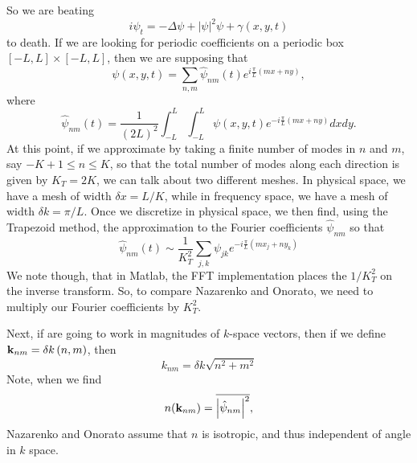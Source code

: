 \documentclass[a4paper,11pt]{article}
\begin{document}
So we are beating
\[
i\psi_{t} = -\Delta \psi + \left| \psi\right|^{2}\psi + \gamma(x,y,t)
\]
to death.  If we are looking for periodic coefficients on a periodic box $[-L,L]\times[-L,L]$, then we are supposing that
\[
\psi(x,y,t) = \sum_{n,m}\hat{\psi}_{nm}(t) e^{i\frac{\pi}{L}(mx + ny)}, 
\]
where
\[
 \hat{\psi}_{nm}(t) = \frac{1}{(2L)^{2}}\int_{-L}^{L}\int_{-L}^{L} \psi(x,y,t) e^{-i\frac{\pi}{L}(mx + ny)} dxdy.
\]
At this point, if we approximate by taking a finite number of modes in $n$ and $m$, say $-K+1\leq n \leq K$, so that the total number of modes along each direction is given by $K_{T}=2K$, we can talk about two different meshes.  In physical space, we have a mesh of width $\delta x = L/K$, while in frequency space, we have a mesh of width $\delta k = \pi/L$.  Once we discretize in physical space, we then find, using the Trapezoid method, the approximation to the Fourier coefficients $\hat{\psi}_{nm}$ so that 
\[
\hat{\psi}_{nm}(t) \sim \frac{1}{K_{T}^{2}}\sum_{j,k}\psi_{jk}e^{-i\frac{\pi}{L}(mx_{j} + ny_{k})}
\]
We note though, that in Matlab, the FFT implementation places the $1/K_{T}^{2}$ on the inverse transform.  So, to compare Nazarenko and Onorato, we need to multiply our Fourier coefficients by $K_{T}^{2}$.  

Next, if are going to work in magnitudes of $k$-space vectors, then if we define ${\bf k}_{nm} = \delta k \left(n,m \right)$, then 
\[
k_{nm} = \delta k \sqrt{n^{2}+m^{2}}
\]
Note, when we find 
\[
n({\bf k}_{nm}) = \overline{\left| \hat{\psi}_{nm}\right|^{2}}, 
\]
Nazarenko and Onorato assume that $n$ is isotropic, and thus independent of angle in $k$ space.  
\end{document}

